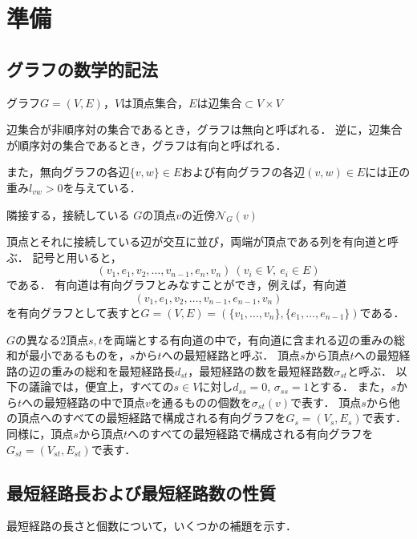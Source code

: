 \chapter{準備}

\section{グラフの数学的記法}
\label{sect:graph-theory}

グラフ$G=(V,E)$，$V$は頂点集合，$E$は辺集合$\subset V\times V$

辺集合が非順序対の集合であるとき，グラフは無向と呼ばれる．
逆に，辺集合が順序対の集合であるとき，グラフは有向と呼ばれる．

また，無向グラフの各辺$\{v,w\}\in E$および有向グラフの各辺$(v,w)\in E$には正の重み$l_{vw}>0$を与えている．

隣接する，接続している
$G$の頂点$v$の近傍$\mathcal{N}_G(v)$

頂点とそれに接続している辺が交互に並び，両端が頂点である列を有向道と呼ぶ．
記号と用いると，
\[ (v_1,e_1,v_2,\ldots,v_{n-1},e_n,v_n)\ (v_i\in V,\ e_i\in E) \]
である．
有向道は有向グラフとみなすことができ，例えば，有向道
\[ (v_1,e_1,v_2,\ldots,v_{n-1},e_{n-1},v_n) \]
を有向グラフとして表すと$G=(V,E)=(\{v_1,\ldots,v_n\},\{e_1,\ldots,e_{n-1}\})$である．

$G$の異なる2頂点$s,t$を両端とする有向道の中で，有向道に含まれる辺の重みの総和が最小であるものを，$s$から$t$への最短経路と呼ぶ．
頂点$s$から頂点$t$への最短経路の辺の重みの総和を最短経路長$d_{st}$，最短経路の数を最短経路数$\sigma_{st}$と呼ぶ．
以下の議論では，便宜上，すべての$s\in V$に対し$d_{ss}=0$, $\sigma_{ss}=1$とする．
また，$s$から$t$への最短経路の中で頂点$v$を通るものの個数を$\sigma_{st}(v)$で表す．
頂点$s$から他の頂点へのすべての最短経路で構成される有向グラフを$G_s=(V_s,E_s)$で表す．
同様に，頂点$s$から頂点$t$へのすべての最短経路で構成される有向グラフを$G_{st}=(V_{st},E_{st})$で表す．

\section{最短経路長および最短経路数の性質}
\label{sect:shortest-paths}

最短経路の長さと個数について，いくつかの補題を示す．


